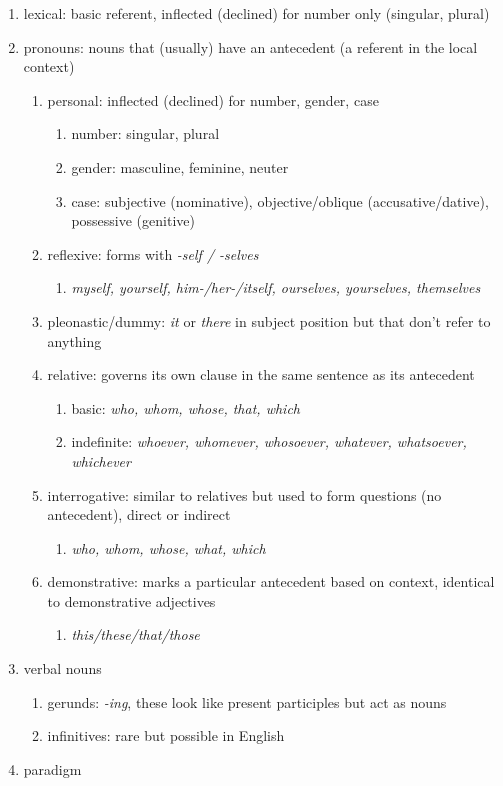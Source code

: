\documentclass[12pt]{article}
\begin{document}
\begin{enumerate}
\item lexical: basic referent, inflected (declined) for number only (singular, plural)
\item pronouns: nouns that (usually) have an antecedent (a referent in the local context)
    \begin{enumerate} 
    \item personal: inflected (declined) for number, gender, case
        \begin{enumerate}
        \item number: singular, plural
        \item gender: masculine, feminine, neuter
        \item case: subjective (nominative), objective/oblique (accusative/dative), possessive (genitive)
        \end{enumerate}
    \item reflexive: forms with \textit{-self / -selves}
        \begin{enumerate}
        \item \textit{myself, yourself, him-/her-/itself, ourselves, yourselves, themselves} 
        \end{enumerate}
    \item pleonastic/dummy: \textit{it} or \textit{there}  in subject position but that don't refer to anything
    \item relative: governs its own clause in the same sentence as its antecedent
        \begin{enumerate}
        \item basic: \textit{who, whom, whose, that, which}
        \item indefinite: \textit{whoever, whomever, whosoever, whatever, whatsoever, whichever}
        \end{enumerate}
    \item interrogative: similar to relatives but used to form questions (no antecedent), direct or indirect
        \begin{enumerate}
        \item \textit{who, whom, whose, what, which}
        \end{enumerate}
    \item demonstrative: marks a particular antecedent based on context, identical to demonstrative adjectives
        \begin{enumerate}
        \item \textit{this/these/that/those}
        \end{enumerate}
    \end{enumerate}
\item verbal nouns
    \begin{enumerate}
    \item gerunds: \textit{-ing}, these look like present participles but act as nouns
    \item infinitives: rare but possible in English
    \end{enumerate}
\item paradigm
\end{enumerate}
\end{document}
